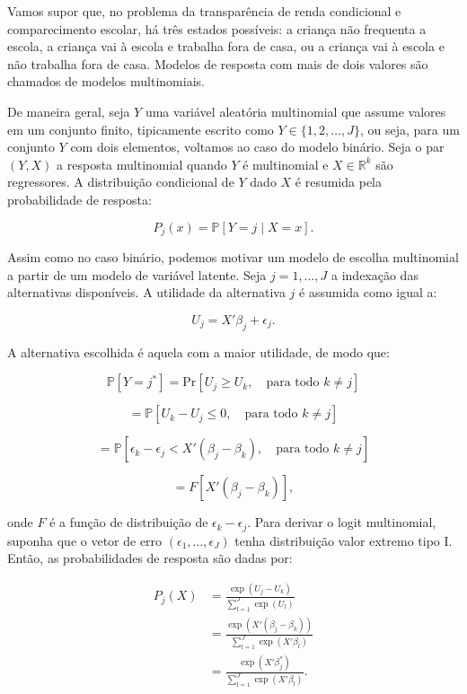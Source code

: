 \documentclass[12pt]{article}
\theoremstyle{break}
\newcommand{\Pb}{\mathbb{P}} %
\begin{document}
Vamos supor que, no problema da transparência de renda condicional e comparecimento escolar, há três estados possíveis: a criança não frequenta a escola, a criança vai à escola e trabalha fora de casa, ou a criança vai à escola e não trabalha fora de casa. Modelos de resposta com mais de dois valores são chamados de modelos multinomiais.

De maneira geral, seja \( Y \) uma variável aleatória multinomial que assume valores em um conjunto finito, tipicamente escrito como \( Y \in \{1,2,\dots,J\} \), ou seja, para um conjunto $Y$ com dois elementos, voltamos ao caso do modelo binário. Seja o par \( (Y, {X}) \) a resposta multinomial quando \( Y \) é multinomial e \( {X} \in \mathbb{R}^k \) são regressores. A distribuição condicional de \( Y \) dado \( {X} \) é resumida pela probabilidade de resposta:

\[
P_j(x) = \Pb[Y = j \mid {X} = x].
\]

Assim como no caso binário, podemos motivar um modelo de escolha multinomial a partir de um modelo de variável latente. Seja \( j = 1, \dots, J \) a indexação das alternativas disponíveis. A utilidade da alternativa \( j \) é assumida como igual a:

\[
U_j = {X}' {\beta}_j + \epsilon_j.
\]

A alternativa escolhida é aquela com a maior utilidade, de modo que:

\[
\Pb[Y = j^*] = \text{Pr}[U_j \geq U_k, \quad \text{para todo } k \neq j]
\]

\[
= \Pb[U_k - U_j \leq 0, \quad \text{para todo } k \neq j]
\]

\[
= \Pb \left[ \epsilon_k - \epsilon_j < {X}' ({\beta}_j - {\beta}_k), \quad \text{para todo } k \neq j \right]
\]

\[
= F \left[ {X}' ({\beta}_j - {\beta}_k) \right],
\]

onde \( F \) é a função de distribuição de \( \epsilon_k - \epsilon_j \). Para derivar o logit multinomial, suponha que o vetor de erro \( (\epsilon_1, \dots, \epsilon_J) \) tenha distribuição valor extremo tipo I. Então, as probabilidades de resposta são dadas por:

\begin{align*}
    P_j({X}) &= \frac{\exp\left( U_j - U_k\right)}{\sum_{l=1}^{J} \exp\left( U_l \right)} \\
     &= \frac{\exp\left( {X}' ({\beta}_j - {\beta}_k) \right)}{\sum_{l=1}^{J} \exp\left( {X}' {\beta}_l \right)} \\
     &= \frac{\exp\left( {X}' {\beta}_j^* \right)}{\sum_{l=1}^{J} \exp\left( {X}' {\beta}_l \right)}.
\end{align*}
\end{document}
